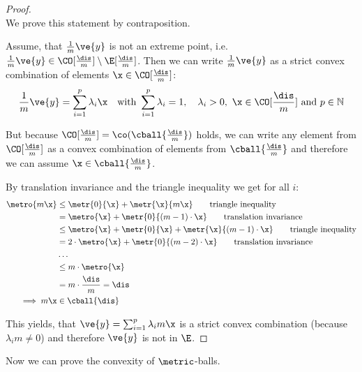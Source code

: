 \begin{proof}~\\
	We prove this statement by contraposition.

  Assume, that $\frac{1}{m}\ve{y}$ is not an extreme point, i.e. $\frac{1}{m}\ve{y} \in \CO[\frac{\dis}{m}] \setminus \E[\frac{\dis}{m}]$.
  Then we can write $\frac{1}{m}\ve{y}$ as a strict convex combination of elements $\x \in \CO[\frac{\dis}{m}]$:
  $$\frac{1}{m}\ve{y} = \sum_{i=1}^p \lambda_i \x \quad \text{with } \sum_{i=1}^p \lambda_i = 1, \quad \lambda_i > 0,~ \x \in \CO[\frac{\dis}{m}] \text{ and } p \in \mathbb{N} $$

	But because $\CO[\frac{\dis}{m}] = \co(\cball{\frac{\dis}{m}})$ holds, we can write any element from $\CO[\frac{\dis}{m}]$ as a convex combination of elements from $\cball{\frac{\dis}{m}}$ and therefore we can assume $\x \in \cball{\frac{\dis}{m}}$.

	By translation invariance and the triangle inequality we get for all $i$:
	\begin{align*}
		\metro{m \x}  & \leq \metr{0}{\x} + \metr{\x}{m \x} \tag*{\text{triangle inequality}}                       \\
		              & = \metro{\x} + \metr{0}{(m-1) \cdot  \x} \tag*{\text{translation invariance}}               \\
		              & \leq \metro{\x} + \metr{0}{\x} + \metr{\x}{(m-1)\cdot \x} \tag*{\text{triangle inequality}} \\
		              & = 2 \cdot \metro{\x} + \metr{0}{(m-2) \cdot \x} \tag*{\text{translation invariance}}        \\
		              & \dots                                                                                       \\
		              & \leq m \cdot \metro{\x}                                                                     \\
		              & = m \cdot \frac{\dis}{m} = \dis                                                         \\
		\implies m \x & \in \cball{\dis}
	\end{align*}

  This yields, that $\ve{y} = \sum_{i=1}^{p} \lambda_i m \x$ is a strict convex combination (because $\lambda_i m \neq 0$) and therefore $\ve{y}$ is not in $\E$.
\end{proof}


Now we can prove the convexity of $\metric$-balls.


